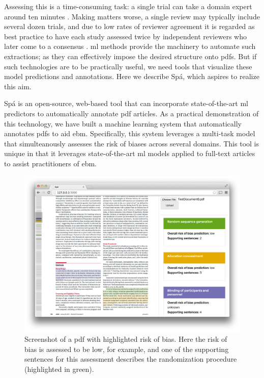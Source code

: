 \documentclass[runningheads,a4paper]{llncs}
\begin{document}
Assessing this is a time-consuming task: a single trial can take a domain expert around ten minutes \cite{Hartling2011}.
Making matters worse, a single review may typically include several dozen trials, and due to low rates of reviewer agreement it is regarded as best practice to have each study assessed twice by independent reviewers who later come to a consensus \cite{Hartling2009}.
\ac{ml} methods provide the machinery to automate such extractions; as they can effectively impose the desired structure onto \acp{pdf}.
But if such technologies are to be practically useful, we need tools that visualize these model predictions and annotations.
Here we describe Spá, which aspires to realize this aim.

Spá is an open-source, web-based tool that can incorporate state-of-the-art \acl{ml} predictors to automatically annotate \ac{pdf} articles.
As a practical demonstration of this technology, we have built a machine learning system that automatically annotates \acp{pdf} to aid \ac{ebm}.
Specifically, this system leverages a multi-task model that simulteanously assesses the risk of biases across several domains.
This tool is unique in that it leverages state-of-the-art \acl{ml} models applied to full-text articles to assist practitioners of \ac{ebm}.

\begin{figure}[htb]
\vspace{-1em}
\centering
\includegraphics[width=0.8\linewidth]{./images/screenshot2.png}
\vspace{-1em}
\caption{\label{fig:screenshot}Screenshot of a \ac{pdf} with highlighted risk of bias. Here the risk of bias is assessed to be low, for example, and one of the supporting sentences for this assessment describes the randomization procedure (highlighted in green).}
\vspace{-1em}
\end{figure}
\end{document}

